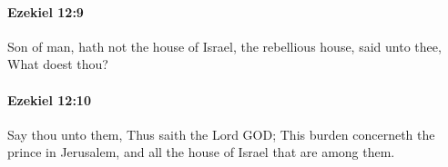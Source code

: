 		\paragraph{Ezekiel 12:9} %
			\label{EZEKIEL-12-9}

			Son of man, hath not the house of Israel, the rebellious house, said unto thee, What doest thou?


		\paragraph{Ezekiel 12:10} %
			\label{EZEKIEL-12-10}

			Say thou unto them, Thus saith the Lord GOD; This burden concerneth the prince in Jerusalem, and all the house of Israel that are among them.


